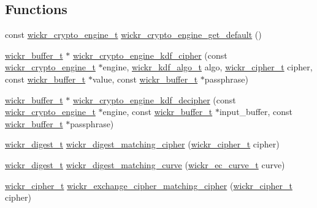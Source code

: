 \subsection*{Functions}
\begin{DoxyCompactItemize}
\item 
const \hyperlink{structwickr__crypto__engine}{wickr\+\_\+crypto\+\_\+engine\+\_\+t} \hyperlink{group__wickr__crypto__engine_ga74d5cea6c7d1d6e67b1be476fbaf6235}{wickr\+\_\+crypto\+\_\+engine\+\_\+get\+\_\+default} ()
\item 
\hyperlink{structwickr__buffer}{wickr\+\_\+buffer\+\_\+t} $\ast$ \hyperlink{group__wickr__crypto__engine_ga5709d94cd09ef0fb47d1a5f59232f115}{wickr\+\_\+crypto\+\_\+engine\+\_\+kdf\+\_\+cipher} (const \hyperlink{structwickr__crypto__engine}{wickr\+\_\+crypto\+\_\+engine\+\_\+t} $\ast$engine, \hyperlink{structwickr__kdf__algo}{wickr\+\_\+kdf\+\_\+algo\+\_\+t} algo, \hyperlink{structwickr__cipher}{wickr\+\_\+cipher\+\_\+t} cipher, const \hyperlink{structwickr__buffer}{wickr\+\_\+buffer\+\_\+t} $\ast$value, const \hyperlink{structwickr__buffer}{wickr\+\_\+buffer\+\_\+t} $\ast$passphrase)
\item 
\hyperlink{structwickr__buffer}{wickr\+\_\+buffer\+\_\+t} $\ast$ \hyperlink{group__wickr__crypto__engine_gab60480270e80ba34aa44385633037983}{wickr\+\_\+crypto\+\_\+engine\+\_\+kdf\+\_\+decipher} (const \hyperlink{structwickr__crypto__engine}{wickr\+\_\+crypto\+\_\+engine\+\_\+t} $\ast$engine, const \hyperlink{structwickr__buffer}{wickr\+\_\+buffer\+\_\+t} $\ast$input\+\_\+buffer, const \hyperlink{structwickr__buffer}{wickr\+\_\+buffer\+\_\+t} $\ast$passphrase)
\item 
\hyperlink{structwickr__digest}{wickr\+\_\+digest\+\_\+t} \hyperlink{group__wickr__crypto__engine_ga18c21501a41c97f2ba79a9366343cdcf}{wickr\+\_\+digest\+\_\+matching\+\_\+cipher} (\hyperlink{structwickr__cipher}{wickr\+\_\+cipher\+\_\+t} cipher)
\item 
\hyperlink{structwickr__digest}{wickr\+\_\+digest\+\_\+t} \hyperlink{group__wickr__crypto__engine_ga0a708e5e46c40eae5eaeb581f6a1aed2}{wickr\+\_\+digest\+\_\+matching\+\_\+curve} (\hyperlink{structwickr__ec__curve}{wickr\+\_\+ec\+\_\+curve\+\_\+t} curve)
\item 
\hyperlink{structwickr__cipher}{wickr\+\_\+cipher\+\_\+t} \hyperlink{group__wickr__crypto__engine_gaf44e3be9066727bf83034d3593dc74e2}{wickr\+\_\+exchange\+\_\+cipher\+\_\+matching\+\_\+cipher} (\hyperlink{structwickr__cipher}{wickr\+\_\+cipher\+\_\+t} cipher)
\end{DoxyCompactItemize}
